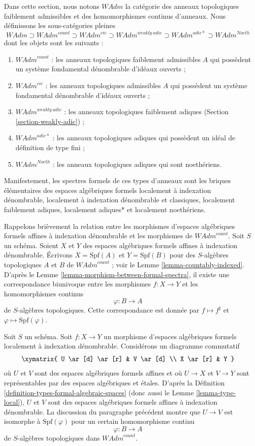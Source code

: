 \noindent
Dans cette section, nous notons $\textit{WAdm}$ la catégorie des
anneaux topologiques faiblement admissibles et des homomorphismes continus d'anneaux.
Nous définissons les sous-catégories pleines
$$
\textit{WAdm} \supset
\textit{WAdm}^{count} \supset
\textit{WAdm}^{cic} \supset
\textit{WAdm}^{weakly\ adic} \supset
\textit{WAdm}^{adic*} \supset
\textit{WAdm}^{Noeth}
$$
dont les objets sont les suivants :
\begin{enumerate}
\item $\textit{WAdm}^{count}$ : les anneaux topologiques faiblement admissibles
$A$ qui possèdent un système fondamental dénombrable d'idéaux ouverts ;
\item $\textit{WAdm}^{cic}$ : les anneaux topologiques admissibles
$A$ qui possèdent un système fondamental dénombrable d'idéaux ouverts ;
\item $\textit{WAdm}^{weakly\ adic}$ : les anneaux topologiques faiblement adiques
(Section \ref{section-weakly-adic}) ;
\item $\textit{WAdm}^{adic*}$ : les anneaux topologiques adiques qui possèdent
un idéal de définition de type fini ;
\item $\textit{WAdm}^{Noeth}$ : les anneaux topologiques adiques qui
sont noethériens.
\end{enumerate}
Manifestement, les spectres formels de ces types d'anneaux sont les briques
élémentaires des espaces algébriques formels
localement à indexation dénombrable,
localement à indexation dénombrable et classiques,
localement faiblement adiques,
localement adiques* et
localement noethériens.

\medskip\noindent
Rappelons brièvement la relation entre les morphismes d'espaces algébriques
formels affines à indexation dénombrable et les
morphismes de $\textit{WAdm}^{count}$.
Soit $S$ un schéma. Soient $X$ et $Y$ des espaces algébriques formels
affines à indexation dénombrable. Écrivons $X = \text{Spf}(A)$
et $Y = \text{Spf}(B)$ pour des $S$-algèbres topologiques
$A$ et $B$ de $\textit{WAdm}^{count}$ ; voir le
Lemme \ref{lemma-countably-indexed}.
D'après le Lemme \ref{lemma-morphism-between-formal-spectra},
il existe une correspondance biunivoque entre les morphismes
$f : X \to Y$ et les homomorphismes continus
$$
\varphi : B \longrightarrow A
$$
de $S$-algèbres topologiques. Cette correspondance est donnée par
$f \mapsto f^\sharp$ et $\varphi \mapsto \text{Spf}(\varphi)$.

\medskip\noindent
Soit $S$ un schéma. Soit $f : X \to Y$ un morphisme d'espaces algébriques
formels localement à indexation dénombrable. Considérons un
diagramme commutatif
$$
\xymatrix{
U \ar[d] \ar[r] & V \ar[d] \\
X \ar[r] & Y
}
$$
où $U$ et $V$ sont des espaces algébriques formels affines et où $U \to X$ et $V \to Y$
sont représentables par des espaces algébriques et étales. D'après la
Définition \ref{definition-types-formal-algebraic-spaces} (donc aussi le
Lemme \ref{lemma-type-local}), $U$ et $V$ sont des espaces algébriques formels
affines à indexation dénombrable. La discussion du paragraphe
précédent montre que $U \to V$ est isomorphe à $\text{Spf}(\varphi)$
pour un certain homomorphisme continu
$$
\varphi : B \longrightarrow A
$$
de $S$-algèbres topologiques dans $\textit{WAdm}^{count}$.

